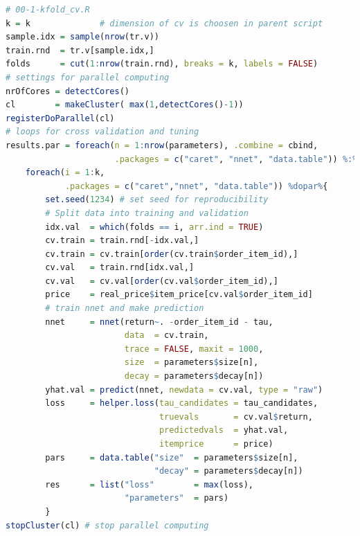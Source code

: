 \documentclass[a4paper,12pt]{article}
\begin{document}
\begin{lstlisting}[language=r]
# 00-1-kfold_cv.R
k = k              # dimension of cv is choosen in parent script
sample.idx = sample(nrow(tr.v))
train.rnd  = tr.v[sample.idx,] 
folds      = cut(1:nrow(train.rnd), breaks = k, labels = FALSE)
# settings for parallel computing
nrOfCores = detectCores()
cl        = makeCluster( max(1,detectCores()-1))
registerDoParallel(cl)
# loops for cross validation and tuning
results.par = foreach(n = 1:nrow(parameters), .combine = cbind, 
                      .packages = c("caret", "nnet", "data.table")) %:%
    foreach(i = 1:k, 
            .packages = c("caret","nnet", "data.table")) %dopar%{
        set.seed(1234) # set seed for reproducibility 
        # Split data into training and validation
        idx.val  = which(folds == i, arr.ind = TRUE)
        cv.train = train.rnd[-idx.val,]
        cv.train = cv.train[order(cv.train$order_item_id),]
        cv.val   = train.rnd[idx.val,]
        cv.val   = cv.val[order(cv.val$order_item_id),]
        price    = real_price$item_price[cv.val$order_item_id]
        # train nnet and make prediction
        nnet     = nnet(return~. -order_item_id - tau, 
                        data  = cv.train,
                        trace = FALSE, maxit = 1000,
                        size  = parameters$size[n], 
                        decay = parameters$decay[n])
        yhat.val = predict(nnet, newdata = cv.val, type = "raw")
        loss     = helper.loss(tau_candidates = tau_candidates, 
                               truevals       = cv.val$return, 
                               predictedvals  = yhat.val, 
                               itemprice      = price)
        pars     = data.table("size"  = parameters$size[n],
                              "decay" = parameters$decay[n])
        res      = list("loss"        = max(loss), 
                        "parameters"  = pars)
        }
stopCluster(cl) # stop parallel computing

\end{lstlisting}
\end{document}
